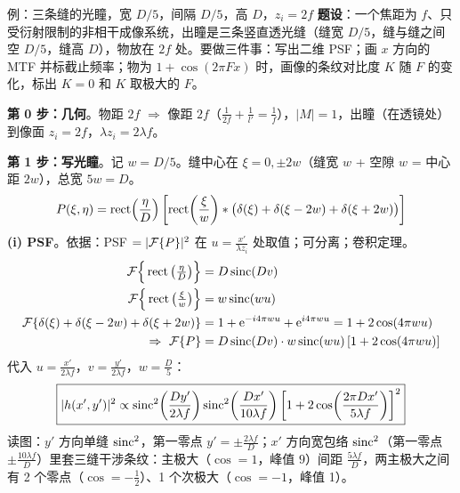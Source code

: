 \begin{exam}{例：三条缝的光瞳，宽 $D/5$，间隔 $D/5$，高 $D$，$z_i=2f$}\label{ex:3slit}
\textbf{题设}：一个焦距为 $f$、只受衍射限制的非相干成像系统，出瞳是三条竖直透光缝（缝宽 $D/5$，缝与缝之间空 $D/5$，缝高 $D$），物放在 $2f$ 处。要做三件事：写出二维 PSF；画 $x$ 方向的 MTF 并标截止频率；物为 $1+\cos(2\pi Fx)$ 时，画像的条纹对比度 $K$ 随 $F$ 的变化，标出 $K=0$ 和 $K$ 取极大的 $F$。

\textbf{第 0 步：几何}。物距 $2f$ $\Rightarrow$ 像距 $2f$（$\frac1{2f}+\frac1{l'}=\frac1f$），$|M|=1$，出瞳（在透镜处）到像面 $z_i=2f$，$\lambda z_i=2\lambda f$。

\textbf{第 1 步：写光瞳}。记 $w=D/5$。缝中心在 $\xi=0,\pm2w$（缝宽 $w$ + 空隙 $w$ = 中心距 $2w$），总宽 $5w=D$。
\[
P(\xi,\eta)=\operatorname{rect}\!\left(\frac{\eta}{D}\right)\left[\operatorname{rect}\!\left(\frac{\xi}{w}\right)\ast\big(\delta(\xi)+\delta(\xi-2w)+\delta(\xi+2w)\big)\right]
\]
\textbf{(i) PSF}。依据：PSF $=|\mathcal{F}\{P\}|^2$ 在 $u=\frac{x'}{\lambda z_i}$ 处取值；可分离；卷积定理。
\begin{align*}
\mathcal{F}\Big\{\operatorname{rect}\big(\tfrac\eta D\big)\Big\}&=D\operatorname{sinc}(Dv)\\
\mathcal{F}\Big\{\operatorname{rect}\big(\tfrac\xi w\big)\Big\}&=w\operatorname{sinc}(wu)\\
\mathcal{F}\{\delta(\xi)+\delta(\xi-2w)+\delta(\xi+2w)\}&=1+\mathrm{e}^{-i4\pi wu}+\mathrm{e}^{i4\pi wu}=1+2\cos(4\pi wu)\\
\Rightarrow\ \mathcal{F}\{P\}&=D\operatorname{sinc}(Dv)\cdot w\operatorname{sinc}(wu)\,[1+2\cos(4\pi wu)]
\end{align*}
代入 $u=\frac{x'}{2\lambda f}$，$v=\frac{y'}{2\lambda f}$，$w=\frac D5$：
\[
\boxed{|h(x',y')|^2\propto\operatorname{sinc}^2\!\left(\frac{Dy'}{2\lambda f}\right)\operatorname{sinc}^2\!\left(\frac{Dx'}{10\lambda f}\right)\left[1+2\cos\!\left(\frac{2\pi Dx'}{5\lambda f}\right)\right]^2}
\]
读图：$y'$ 方向单缝 $\operatorname{sinc}^2$，第一零点 $y'=\pm\frac{2\lambda f}{D}$；$x'$ 方向宽包络 $\operatorname{sinc}^2$（第一零点 $\pm\frac{10\lambda f}{D}$）里套三缝干涉条纹：主极大（$\cos=1$，峰值 $9$）间距 $\frac{5\lambda f}{D}$，两主极大之间有 2 个零点（$\cos=-\frac12$）、1 个次极大（$\cos=-1$，峰值 1）。


\end{exam}
